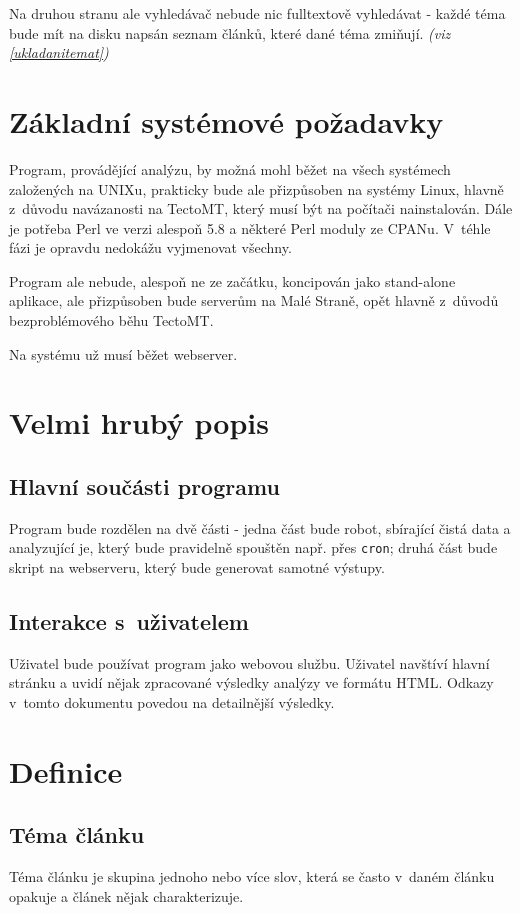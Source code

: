 \documentclass[12pt]{amsart}
\begin{document}
Na druhou stranu ale vyhledávač nebude nic fulltextově vyhledávat - každé téma bude mít na disku  napsán seznam článků, které dané téma zmiňují. \emph{(viz \ref{ukladanitemat})}

\section {Základní systémové požadavky}
Program, provádějící analýzu, by možná mohl běžet na všech systémech za\-lo\-že\-ných na UNIXu, prakticky bude ale přizpůsoben na systémy Linux, hlavně z~důvodu navázanosti na TectoMT, který musí být na počítači nainstalován. Dále je potřeba Perl ve verzi alespoň 5.8 a některé Perl moduly ze CPANu. V~téhle fázi je opravdu nedokážu vyjmenovat všechny.

Program ale nebude, alespoň ne ze začátku, koncipován jako stand-alone aplikace, ale přizpůsoben bude serverům na Malé Straně, opět hlavně z~důvodů bezproblémového běhu TectoMT.

Na systému už musí běžet webserver.

\section{Velmi hrubý popis}
\subsection{Hlavní součásti programu}
Program bude rozdělen na dvě části - jedna část bude robot, sbírající čistá data a analyzující je, který bude pravidelně spou\-štěn např. přes \texttt{cron}; druhá část bude skript na webserveru, který bude generovat sa\-mot\-né výs\-tu\-py.

\subsection{Interakce s~uživatelem}
Uživatel bude používat program jako webovou službu. Uživatel navštíví hlavní stránku a uvidí nějak zpracované výsledky a\-na\-lý\-zy ve formátu HTML. Odkazy v~tomto dokumentu povedou na de\-tail\-něj\-ší vý\-sled\-ky.

\section{Definice}
\subsection{Téma článku}
\label{deftema}
Téma článku je skupina jednoho nebo více slov, která se často v~daném článku opakuje a článek nějak charakterizuje. 
\end{document}
